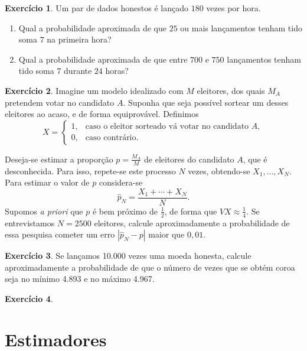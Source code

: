 \documentclass[12pt,a4paper]{article}
\theoremstyle{definition}
\newtheorem{exercise}{Exercício}
\begin{document}
\begin{exercise}
Um par de dados honestos é lançado $180$ vezes por hora.
\begin{enumerate}
\item
Qual a probabilidade aproximada de que $25$ ou mais lançamentos tenham tido soma $7$ na primeira hora?
\item
Qual a probabilidade aproximada de que entre $700$ e $750$ lançamentos tenham tido soma $7$ durante $24$ horas?
\end{enumerate}
\end{exercise}

\begin{exercise}
Imagine um modelo idealizado com $M$ eleitores, dos quais $M_A$
pretendem votar no candidato $A$. Suponha que seja possível sortear um
desses eleitores ao acaso, e de forma equiprovável.
Definimos
$$
  X=
\begin{cases}
1, & \mbox{caso o eleitor sorteado vá votar no candidato $A$},
\\
0, & \mbox{caso contrário}.
\end{cases}
$$

Deseja-se estimar a proporção $p=\frac{M_A}M$ de eleitores do candidato $A$,
que é desconhecida.
Para isso, repete-se este processo $N$ vezes, obtendo-se $X_1,\dots,X_N$.
Para estimar o valor de $p$ considera-se
$$
  \widehat p_N = \frac {X_1+\cdots+X_N}N.
$$
Supomos \textsl{a priori} que $p$ é bem próximo de $\frac{1}{2}$, de forma que
$VX \approx \frac{1}{4}$.
Se entrevistamos $N=2500$ eleitores, calcule aproximadamente a probabilidade de
essa pesquisa cometer um erro $|\widehat p_N - p|$ maior que $0,01$.
\end{exercise}

\begin{exercise}
Se lançamos 10.000 vezes uma moeda honesta, calcule aproximadamente a
probabilidade de que o número de vezes que se obtém coroa seja no mínimo 4.893
e no máximo 4.967.
\end{exercise}

\begin{exercise}
\end{exercise}


\clearpage
\section{Estimadores}
\end{document}
